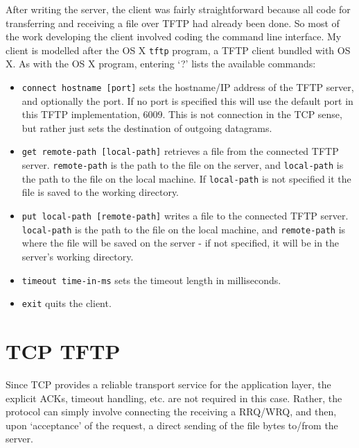 \documentclass[a4paper]{article}
\newcommand{\code}{\texttt}
\begin{document}
After writing the server, the client was fairly straightforward because all code for transferring and receiving a file over TFTP had already been done. So most of the work developing the client involved coding the command line interface. My client is modelled after the OS X \code{tftp} program, a TFTP client bundled with OS X. As with the OS X program, entering `?' lists the available commands:
\begin{itemize}
\item \code{connect hostname [port]} sets the hostname/IP address of the TFTP server, and optionally the port. If no port is specified this will use the default port in this TFTP implementation, 6009. This is not connection in the TCP sense, but rather just sets the destination of outgoing datagrams.
\item \code{get remote-path [local-path]} retrieves a file from the connected TFTP server. \code{remote-path} is the path to the file on the server, and \code{local-path} is the path to the file on the local machine. If \code{local-path} is not specified it the file is saved to the working directory. 
\item \code{put local-path [remote-path]} writes a file to the connected TFTP server. \code{local-path} is the path to the file on the local machine, and \code{remote-path} is where the file will be saved on the server - if not specified, it will be in the server's working directory.
\item \code{timeout time-in-ms} sets the timeout length in milliseconds.
\item \code{exit} quits the client.
\end{itemize}

\section{TCP TFTP}

Since TCP provides a reliable transport service for the application layer, the explicit ACKs, timeout handling, etc. are not required in this case. Rather, the protocol can simply involve connecting the receiving a RRQ/WRQ, and then, upon `acceptance' of the request, a direct sending of the file bytes to/from the server. 
\end{document}
